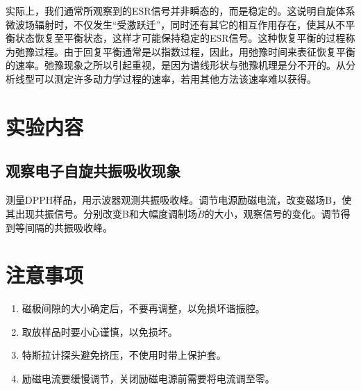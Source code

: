 \documentclass[a4paper]{article}
\begin{document}
实际上，我们通常所观察到的ESR信号并非瞬态的，而是稳定的。这说明自旋体系微波场辐射时，不仅发生“受激跃迁”，同时还有其它的相互作用存在，使其从不平衡状态恢复至平衡状态，这样才可能保持稳定的ESR信号。这种恢复平衡的过程称为弛豫过程。由于回复平衡通常是以指数过程，因此，用弛豫时间来表征恢复平衡的速率。弛豫现象之所以引起重视，是因为谱线形状与弛豫机理是分不开的。从分析线型可以测定许多动力学过程的速率，若用其他方法该速率难以获得。

\section{实验内容}
\subsection{观察电子自旋共振吸收现象}
测量DPPH样品，用示波器观测共振吸收峰。调节电源励磁电流，改变磁场B，使其出现共振信号。分别改变B和大幅度调制场$\tilde{B}$的大小，观察信号的变化。调节得到等间隔的共振吸收峰。

\section{注意事项}
\begin{enumerate}
\item 磁极间隙的大小确定后，不要再调整，以免损坏谐振腔。
\item 取放样品时要小心谨慎，以免损坏。
\item 特斯拉计探头避免挤压，不使用时带上保护套。
\item 励磁电流要缓慢调节，关闭励磁电源前需要将电流调至零。
\end{enumerate}
\end{document}
